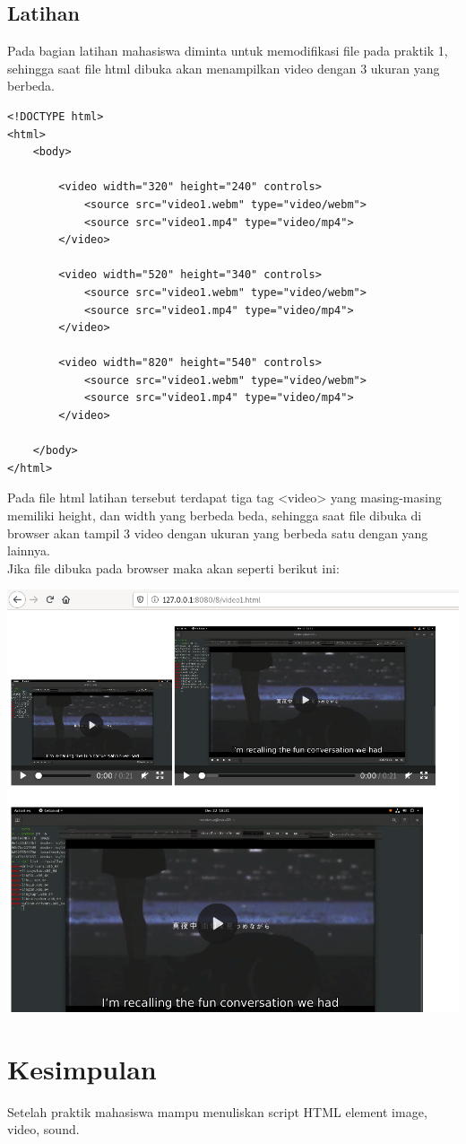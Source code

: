 \documentclass[a4paper,12pt]{article}
\begin{document}
\newpage

\subsection{Latihan}
Pada bagian latihan mahasiswa diminta untuk memodifikasi file pada praktik 1, sehingga saat file html dibuka akan
menampilkan video dengan 3 ukuran yang berbeda.\\
\begin{lstlisting}[style=htmlcssjs]
<!DOCTYPE html>
<html>
    <body>

        <video width="320" height="240" controls>
            <source src="video1.webm" type="video/webm">
            <source src="video1.mp4" type="video/mp4">
        </video>

        <video width="520" height="340" controls>
            <source src="video1.webm" type="video/webm">
            <source src="video1.mp4" type="video/mp4">
        </video>

        <video width="820" height="540" controls>
            <source src="video1.webm" type="video/webm">
            <source src="video1.mp4" type="video/mp4">
        </video>

    </body>
</html>
\end{lstlisting}

Pada file html latihan tersebut terdapat tiga tag <video> yang masing-masing memiliki height, dan width yang berbeda
beda, sehingga saat file dibuka di browser akan tampil 3 video dengan ukuran yang berbeda satu dengan yang lainnya.\\

Jika file dibuka pada browser maka akan seperti berikut ini:
\begin{center}
    \includegraphics[width=0.8\linewidth]{3.png}
\end{center}

\newpage

\section{Kesimpulan}
Setelah praktik mahasiswa mampu menuliskan script HTML element image, video, sound.
\end{document}
